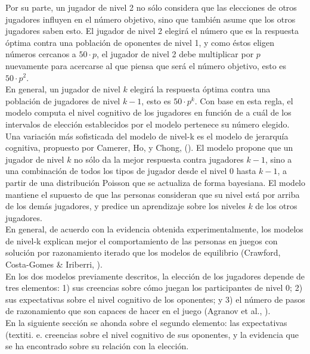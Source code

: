 Por su parte, un jugador de nivel 2 no sólo considera que las elecciones de otros jugadores influyen en el número objetivo, sino que también asume que los otros jugadores saben esto. El jugador de nivel 2 elegirá el número que es la respuesta óptima contra una población de oponentes de nivel 1, y como éstos eligen números cercanos a $50 \cdot p$, el jugador de nivel 2 debe multiplicar por $p$ nuevamente para acercarse al que piensa que será el número objetivo, esto es $50 \cdot p^2$.\\

En general, un jugador de nivel $k$ elegirá la respuesta óptima contra una población de jugadores de nivel $k-1$, esto es $50 \cdot p^k$.  Con base en esta regla, el modelo computa el nivel cognitivo de los jugadores en función de a cuál de los intervalos de elección establecidos por el modelo pertenece su número elegido.\\

Una variación más sofisticada del modelo de nivel-k es el modelo de jerarquía cognitiva, propuesto por Camerer, Ho, y Chong, (\citeyear{Camerer}). El modelo propone que un jugador de nivel $k$ no sólo da la mejor respuesta contra jugadores $k-1$, sino a una combinación de todos los tipos de jugador desde el nivel 0 hasta $k-1$, a partir de una distribución Poisson que se actualiza de forma bayesiana. El modelo mantiene el supuesto de que las personas consideran que su nivel está por arriba de los demás jugadores, y predice un aprendizaje sobre los niveles $k$ de los otros jugadores.\\

En general, de acuerdo con la evidencia obtenida experimentalmente, los modelos de nivel-k explican mejor el comportamiento de las personas en juegos con solución por razonamiento iterado que los modelos de equilibrio (Crawford, Costa-Gomes & Iriberri, \citeyear{Crawford}).\\

En los dos modelos previamente descritos, la elección de los jugadores depende de tres elementos: 1) sus creencias sobre cómo juegan los participantes de nivel 0; 2) sus expectativas sobre el nivel cognitivo de los oponentes; y 3) el número de pasos de razonamiento que son capaces de hacer en el juego (Agranov et al., \citeyear{Agranov}).\\

En la siguiente sección se ahonda sobre el segundo elemento: las expectativas (textit{i. e. creencias} sobre el nivel cognitivo de sus oponentes, y la evidencia que se ha encontrado sobre su relación con la elección.\\

